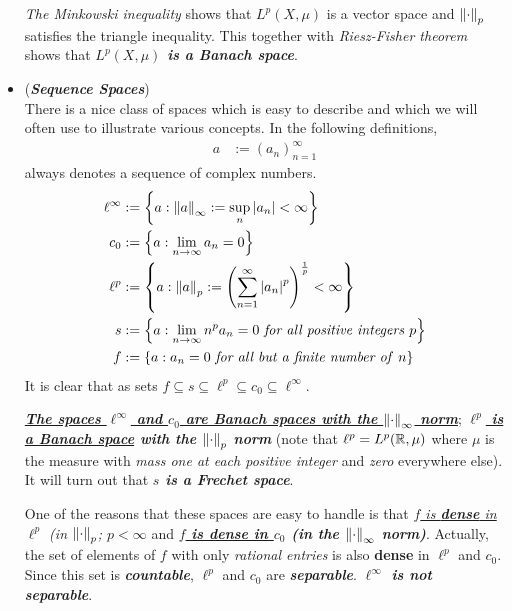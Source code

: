 \documentclass[11pt]{article}
\begin{document}
\begin{itemize}
\begin{example}
\begin{remark}
\emph{The Minkowski inequality} shows that $L^{p}(X, \mu)$ is a vector space and $\left\|\cdot\right\|_{p}$ satisfies the triangle inequality. This together with \emph{Riesz-Fisher theorem} shows that \emph{\textbf{$L^{p}(X, \mu)$ is a Banach space}}.
\end{remark}
\end{example}



\item \begin{example}(\emph{\textbf{Sequence Spaces}})\\
There is a nice class of spaces which is easy to describe and which we will often use to illustrate various concepts.
In the following definitions,
\begin{align*}
a &:= (a_n)_{n=1}^{\infty}
\end{align*} always denotes a sequence of complex numbers.
\begin{align*}
\ell^{\infty} &:= \left\{a: \left\|a\right\|_{\infty}:= \sup_{n}\left\lvert a_n \right\rvert < \infty \right\}\\
c_{0} &:= \left\{a: \lim\limits_{n\rightarrow \infty}a_n = 0\right\}\\
\ell^{p} &:= \left\{a: \left\|a\right\|_{p}:= \left(\sum_{n=1}^{\infty}\left\lvert a_n \right\rvert^{p}\right)^{\frac{1}{p}} < \infty \right\}\\
s &:= \left\{a:  \lim\limits_{n\rightarrow \infty}n^{p}a_{n}= 0 \text{ \emph{for all positive integers} }p\right\}\\
f &:=  \left\{a: a_{n} = 0\text{ \emph{for all but a finite number of} }n\right\}
\end{align*} It is clear that as sets $f \subseteq s \subseteq \ell^{p} \subseteq c_{0} \subseteq \ell^{\infty}$.

\underline{\emph{\textbf{The spaces $\ell^{\infty}$ and $c_{0}$ are Banach spaces with the $\left\|\cdot\right\|_{\infty}$ norm}}}; \emph{\textbf{\underline{$\ell^{p}$ is a Banach space} with the $\left\|\cdot\right\|_{p}$ norm}} (note that $\ell^{p}= L^{p}({\mathbb R}, \mu)$ where $\mu$ is the measure with \emph{mass one at each positive integer} and \emph{zero} everywhere else). It will turn out that \emph{\textbf{$s$ is a Frechet space}}. 

One of the reasons that these spaces are easy to handle is that \emph{\underline{$f$ is \textbf{dense} in $\ell^{p}$} (in $\left\|\cdot\right\|_{p}$; $p < \infty$} and \emph{\textbf{\underline{$f$ is dense in $c_{0}$} (in the $\left\|\cdot\right\|_{\infty}$ norm)}}. Actually, the set of elements of $f$ with only \emph{rational entries} is also \textbf{dense} in $\ell^{p}$ and $c_{0}$. Since this set is \emph{\textbf{countable}}, $\ell^{p}$ and $c_{0}$ are \emph{\textbf{separable}}. \emph{\textbf{$\ell^{\infty}$ is not separable}}.
\end{example}


\end{itemize}
\end{document}

